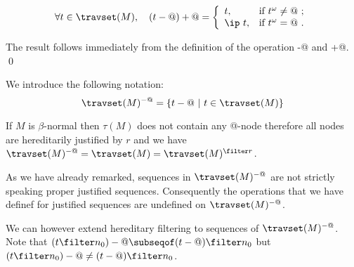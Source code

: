 \begin{lemma} \label{lem:minus_at_plus_at}
$$\forall t \in \travset(M), \quad (t-@)+@ = \left\{
            \begin{array}{ll}
              t, & \hbox{if $t^\omega \neq @$\ ;} \\
              \ip\ t, & \hbox{if $t^\omega = @$\ .}
            \end{array}
          \right.
$$
\end{lemma}
\proof
The result follows immediately from the definition of the operation -@ and +@.
\qed
\smallskip

We introduce the following notation:
$$
\travset(M)^{-@} = \{ t - @ \ | \  t \in \travset(M) \}
$$

\begin{remark}
If $M$ is $\beta$-normal then $\tau(M)$ does not contain any
@-node therefore all nodes are hereditarily justified by $r$ and we
have $\travset(M)^{-@} = \travset(M) = \travset(M)^{\filter
r }$.
\end{remark}



As we have already remarked, sequences in $\travset(M)^{-@}$ are not strictly speaking proper justified sequences. Consequently the operations that we have definef for
justified sequences are undefined on $\travset(M)^{-@}$.


We can however extend hereditary filtering to sequences of $\travset(M)^{-@}$.
Note that $(t\filter n_0)-@ \subseqof (t-@) \filter n_0$
but $(t\filter n_0)-@ \neq (t-@) \filter n_0$.



